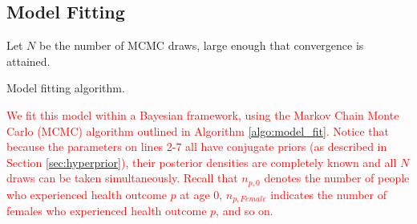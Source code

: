 \documentclass[final]{statsoc}
\begin{document}
\subsection{Model Fitting}
\begin{algorithm}
  Let $N$ be the number of MCMC draws, large enough that convergence is attained.
  \BlankLine
  \caption{Model fitting algorithm. \label{algo:model_fit}}
\end{algorithm}

\textcolor{red}{We fit this model within a Bayesian framework, using the Markov Chain Monte Carlo (MCMC) algorithm outlined in Algorithm \ref{algo:model_fit}. Notice that because the parameters on lines 2-7 all have conjugate priors (as described in Section \ref{sec:hyperprior}), their posterior densities are completely known and all $N$ draws can be taken simultaneously. Recall that $n_{p,0}$ denotes the number of people who experienced health outcome $p$ at age $0$, $n_{p,Female}$ indicates the number of females who experienced health outcome $p$, and so on. }
\end{document}
